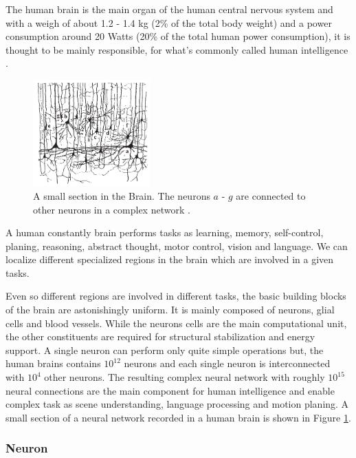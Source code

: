 The human brain is the main organ of the human central nervous system and with a weigh of about 1.2 - 1.4 kg (2\% of the total body weight) and a power consumption around 20 Watts (20\% of the total human power consumption), it is thought to be mainly responsible, for what's commonly called human intelligence \cite{gerstner2014neuronal}\cite{Byrne1997}.  

\begin{figure}
	\centering
    	\includegraphics[width=0.4\textwidth]{imgs/brain.png} 
    \caption{A small section in the Brain. The neurons $a$ - $g$ are connected to other neurons in a complex network \cite{gerstner2014neuronal}.}
	\label{fig:brain}
\end{figure}

A human constantly brain performs tasks as learning, memory, self-control, planing, reasoning, abstract thought, motor control, vision and language.
We can localize different specialized regions in the brain which are involved in a given tasks. 

Even so different regions are involved in different tasks, the basic building blocks of the brain are astonishingly uniform. 
It is mainly composed of neurons, glial cells and blood vessels.
While the neurons cells are the main computational unit, the other constituents are required for structural stabilization and energy support.
A single neuron can perform only quite simple operations but, the human brains contains $10^{12}$ neurons and each single neuron is interconnected with $10^{4}$ other neurons.
The resulting complex neural network with roughly $10^{15}$ neural connections are the main component for human intelligence and enable complex task as scene understanding, language processing and motion planing. A small section of a neural network recorded in a human brain is shown in Figure \ref{fig:brain}. 

\subsubsection{Neuron}

